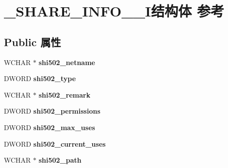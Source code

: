 \hypertarget{struct___s_h_a_r_e___i_n_f_o__502___i}{}\section{\+\_\+\+S\+H\+A\+R\+E\+\_\+\+I\+N\+F\+O\+\_\+\_\+\+I结构体 参考}
\label{struct___s_h_a_r_e___i_n_f_o__502___i}
\subsection*{Public 属性}
\begin{DoxyCompactItemize}
\item 
\mbox{\label{struct___s_h_a_r_e___i_n_f_o__502___i_abd0af268ef7378e832e0243146a64194}} 
W\+C\+H\+AR $\ast$ {\bfseries shi502\+\_\+netname}
\item 
\mbox{\label{struct___s_h_a_r_e___i_n_f_o__502___i_a1e7694c25f82d4d23cd189098edb8040}} 
D\+W\+O\+RD {\bfseries shi502\+\_\+type}
\item 
\mbox{\label{struct___s_h_a_r_e___i_n_f_o__502___i_a5224f825f236b4c6275d8e2b3067009e}} 
W\+C\+H\+AR $\ast$ {\bfseries shi502\+\_\+remark}
\item 
\mbox{\label{struct___s_h_a_r_e___i_n_f_o__502___i_a57bae96aa931f9a8ac8cea0f150ed872}} 
D\+W\+O\+RD {\bfseries shi502\+\_\+permissions}
\item 
\mbox{\label{struct___s_h_a_r_e___i_n_f_o__502___i_a371391512c435cde577a107c481b5245}} 
D\+W\+O\+RD {\bfseries shi502\+\_\+max\+\_\+uses}
\item 
\mbox{\label{struct___s_h_a_r_e___i_n_f_o__502___i_a1d9966e85c9ee2769e02e6e693e62743}} 
D\+W\+O\+RD {\bfseries shi502\+\_\+current\+\_\+uses}
\item 
\mbox{\label{struct___s_h_a_r_e___i_n_f_o__502___i_ad8a41c63a541ee5e768e9632fc0c4c09}} 
W\+C\+H\+AR $\ast$ {\bfseries shi502\+\_\+path}
\item 

\end{DoxyCompactItemize}
